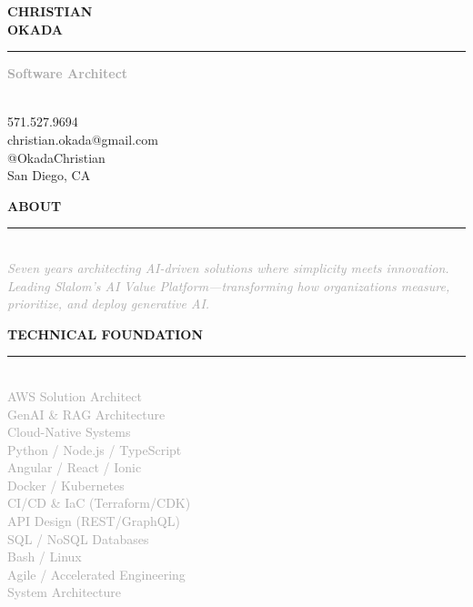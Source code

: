 \documentclass[10pt,letterpaper]{article}
\newcommand{\sidebarheader}[1]{%
    \vspace{8pt}
    {\headingfont\small\textcolor{accent}{\MakeUppercase{\textbf{#1}}}}
    \vspace{2pt}
    \par\noindent\textcolor{accent}{\rule{\linewidth}{1.5pt}}
    \vspace{3pt}
}
\begin{document}
\noindent\colorbox{sidebarBg}{%
\begin{minipage}[t][10.5in][t]{2.7in}
\vspace{0.4in}
\hspace{0.3in}
\begin{minipage}{2.1in}
\raggedright

{\displayfont\fontsize{24}{28}\selectfont\textcolor{primary}{\textbf{CHRISTIAN}}}\\[-2pt]
{\displayfont\fontsize{24}{28}\selectfont\textcolor{accent}{\textbf{OKADA}}}

\vspace{4pt}
\noindent\textcolor{accent}{\rule{1.8in}{2.5pt}}
\vspace{6pt}

{\headingfont\small\textcolor{darkgray}{\textbf{Software Architect}}}

\vspace{6pt}

{\footnotesize\textcolor{mediumgray}{\\[-6pt]
571.527.9694\\[3pt]
christian.okada@gmail.com\\[3pt]
@OkadaChristian\\[3pt]
San Diego, CA\\[3pt]
}}

\sidebarheader{About}
{\footnotesize\textcolor{darkgray}{\\[-6pt]\itshape Seven years architecting AI-driven solutions where simplicity meets innovation. Leading Slalom's AI Value Platform—transforming how organizations measure, prioritize, and deploy generative AI.}}

\sidebarheader{Technical Foundation}
{\scriptsize\textcolor{darkgray}{\\[-6pt]
AWS Solution Architect\\[3pt]
GenAI \& RAG Architecture\\[3pt]
Cloud-Native Systems\\[3pt]
Python / Node.js / TypeScript\\[3pt]
Angular / React / Ionic\\[3pt]
Docker / Kubernetes\\[3pt]
CI/CD \& IaC (Terraform/CDK)\\[3pt]
API Design (REST/GraphQL)\\[3pt]
SQL / NoSQL Databases\\[3pt]
Bash / Linux\\[3pt]
Agile / Accelerated Engineering\\[3pt]
System Architecture\\[3pt]
}}


\end{minipage}
\end{minipage}}
\end{document}
